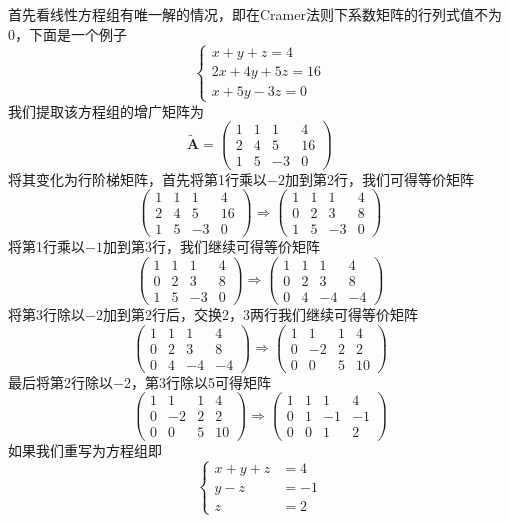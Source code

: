 首先看线性方程组有唯一解的情况，即在Cramer法则下系数矩阵的行列式值不为0，下面是一个例子$$\left\{\begin{matrix} 
	x+y+z=4 \\  
	2x+4y+5z=16 \\
	x+5y-3z=0
\end{matrix}\right. $$我们提取该方程组的增广矩阵为$$\tilde{\mathbf{A}}=\begin{pmatrix}
	1 & 1 & 1 & 4\\
	2 & 4 & 5 & 16\\
	1 & 5 & -3 & 0
\end{pmatrix}$$将其变化为行阶梯矩阵，首先将第1行乘以$-2$加到第2行，我们可得等价矩阵$$\begin{pmatrix}
	1 & 1 & 1 & 4\\
	2 & 4 & 5 & 16\\
	1 & 5 & -3 & 0
\end{pmatrix}\Longrightarrow  \begin{pmatrix}
	1 & 1 & 1 & 4\\
	0 & 2 & 3 & 8\\
	1 & 5 & -3 & 0
\end{pmatrix}$$将第1行乘以$-1$加到第3行，我们继续可得等价矩阵$$\begin{pmatrix}
	1 & 1 & 1 & 4\\
	0 & 2 & 3 & 8\\
	1 & 5 & -3 & 0
\end{pmatrix}\Longrightarrow  \begin{pmatrix}
	1 & 1 & 1 & 4\\
	0 & 2 & 3 & 8\\
	0 & 4 & -4 & -4
\end{pmatrix}$$将第3行除以$-2$加到第2行后，交换2，3两行我们继续可得等价矩阵$$\begin{pmatrix}
	1 & 1 & 1 & 4\\
	0 & 2 & 3 & 8\\
	0 & 4 & -4 & -4
\end{pmatrix}\Longrightarrow  \begin{pmatrix}
	1 & 1 & 1 & 4\\
	0 & -2 & 2 & 2\\
	0 & 0 & 5 & 10
\end{pmatrix}$$最后将第2行除以$-2$，第3行除以5可得矩阵$$\begin{pmatrix}
	1 & 1 & 1 & 4\\
	0 & -2 & 2 & 2\\
	0 & 0 & 5 & 10
\end{pmatrix}\Longrightarrow  \begin{pmatrix}
	1 & 1 & 1 & 4\\
	0 & 1 & -1 & -1\\
	0 & 0 & 1 & 2
\end{pmatrix}$$如果我们重写为方程组即$$\left\{\begin{aligned} 
	x+y+z&=4 \\  
	y-z&=-1\\
	z&=2
\end{aligned}\right. $$

